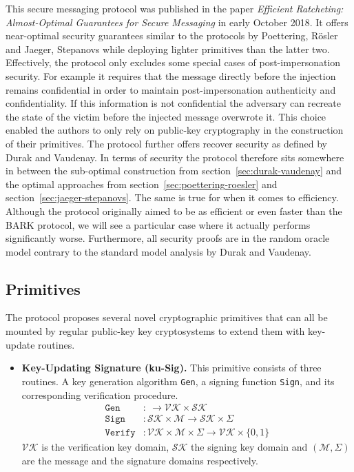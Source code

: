 \documentclass[11pt,a4paper,twoside,openright,bibliography=totoc]{scrbook}
\begin{document}
This secure messaging protocol was published in the paper
\textit{Efficient Ratcheting: Almost-Optimal Guarantees for Secure Messaging}
in early October 2018. It offers near-optimal security guarantees similar
to the protocols by Poettering, Rösler and Jaeger, Stepanovs while
deploying lighter primitives than the latter two. Effectively, the protocol
only excludes some special cases of post-impersonation security.
For example it requires that the message directly before
the injection remains confidential in order to maintain
post-impersonation authenticity and confidentiality. If this
information is not confidential the adversary can
recreate the state of the victim before the injected message overwrote it.
This choice enabled the authors to only rely on public-key cryptography in
the construction of their primitives. The protocol further
offers recover security as defined by Durak and Vaudenay.
In terms of security the protocol therefore sits somewhere in
between the sub-optimal construction from section~\ref{sec:durak-vaudenay}
and the optimal approaches from section~\ref{sec:poettering-roesler}
and section~\ref{sec:jaeger-stepanovs}. The same is true
for when it comes to efficiency. Although the protocol originally aimed
to be as efficient or even faster than the BARK protocol,
we will see a particular case where it actually performs significantly worse.
Furthermore, all security proofs are in the random oracle model contrary
to the standard model analysis by Durak and Vaudenay.

\subsection{Primitives}
\label{sec:primitives-3}

The protocol proposes several novel cryptographic primitives that can all be
mounted by regular public-key key cryptosystems to extend them
with key-update routines.
\begin{itemize}
\item \textbf{Key-Updating Signature (ku-Sig).} This primitive consists of
  three routines. A key generation algorithm \texttt{Gen}, a signing function
  \texttt{Sign}, and its corresponding verification procedure.
  \begin{align*}
    \texttt{Gen} & : \ \rightarrow \mathcal{VK} \times \mathcal{SK} \\
    \texttt{Sign} & : \mathcal{SK} \times \mathcal{M} \rightarrow \mathcal{SK} \times \Sigma \\
    \texttt{Verify} & : \mathcal{VK} \times \mathcal{M} \times \Sigma
             \rightarrow \mathcal{VK} \times \{0,1\}
  \end{align*}
  $\mathcal{VK}$ is the verification key domain, $\mathcal{SK}$ the signing
  key domain and $(\mathcal{M},\Sigma)$ are the message and the signature domains
  respectively.
\end{itemize}
\end{document}
